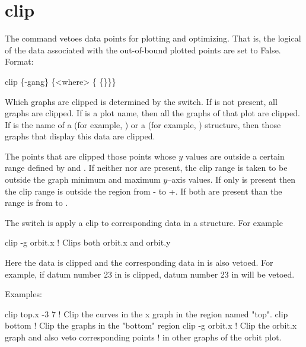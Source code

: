 \section{clip}
\label{s:clip}

The  command vetoes data points for plotting and optimizing. That is, the 
logical of the data associated with the out-of-bound plotted points are set to False.  Format:
\begin{example}
  clip \{-gang\} \{<where> \{<limit1> \{<limit2>\}\}\}
\end{example}

\vskip 10pt Which graphs are clipped is determined by the  switch. If  is
not present, all graphs are clipped. If  is a plot name, then all the graphs of that plot
are clipped. If  is the name of a  (for example, ) or a 
(for example, ) structure, then those graphs that display this data are clipped.

The points that are clipped those points whose $y$ values are outside a certain range defined by
 and . If neither  nor  are present, the clip
range is taken to be outside the graph minimum and maximum $y$--axis values. If only 
is present then the clip range is outside the region from - to +. If both
are present than the range is from  to .

The  switch is apply a clip to corresponding data in a  structure. For example
\begin{example}
  clip -g orbit.x   ! Clips both orbit.x and orbit.y 
\end{example}
Here the  data is clipped and the corresponding data in  is also vetoed. For
example, if datum number 23 in  is clipped, datum number 23 in  will be
vetoed.

Examples:
\begin{example}
  clip top.x -3  7  ! Clip the curves in the x graph in the region named "top".
  clip bottom       ! Clip the graphs in the "bottom" region
  clip -g orbit.x   ! Clip the orbit.x graph and also veto corresponding points
                    ! in other graphs of the orbit plot.
\end{example}

